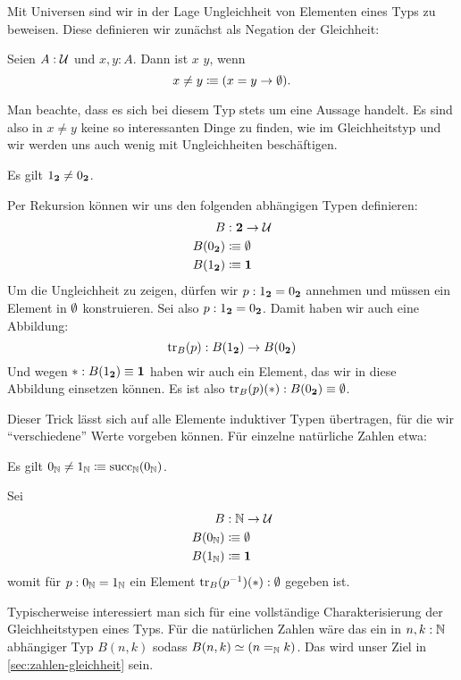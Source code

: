 Mit Universen sind wir in der Lage Ungleichheit von Elementen eines Typs zu beweisen.
Diese definieren wir zunächst als Negation der Gleichheit:
\begin{definition}
  Seien $A:\mathcal{U}$ und $x,y:A$. Dann ist $x$  $y$, wenn
  \[
    x\not= y\vcentcolon\mspace{-1.2mu}\equiv (x=y\to \emptyset).
  \]
\end{definition}
Man beachte, dass es sich bei diesem Typ stets um eine Aussage handelt.
Es sind also in $x\not= y$ keine so interessanten Dinge zu finden, wie im Gleichheitstyp und wir werden uns auch wenig mit Ungleichheiten beschäftigen.
\begin{bemerkung}
  Es gilt $1_{\mathbf{2}} \not= 0_{\mathbf{2}}$.
\end{bemerkung}
\begin{beweis}
  Per Rekursion können wir uns den folgenden abhängigen Typen definieren:
  \begin{align*}
    B&:\mathbf{2}\to\mathcal{U} \\
    B(0_{\mathbf{2}})&\vcentcolon\mspace{-1.2mu}\equiv \emptyset \\
    B(1_{\mathbf{2}})&\vcentcolon\mspace{-1.2mu}\equiv \mathbf{1}
  \end{align*}
  Um die Ungleichheit zu zeigen, dürfen wir $p:1_{\mathbf{2}} = 0_{\mathbf{2}}$ annehmen und müssen ein Element in $\emptyset$ konstruieren.
  Sei also $p:1_{\mathbf{2}} = 0_{\mathbf{2}}$. Damit haben wir auch eine Abbildung:
  \[
    \mathrm{tr}_B(p):B(1_{\mathbf{2}})\to B(0_{\mathbf{2}})
  \]
  Und wegen $\ast:B(1_{\mathbf{2}})\equiv \mathbf{1}$ haben wir auch ein Element, das wir in diese Abbildung einsetzen können.
  Es ist also $\mathrm{tr}_B(p)(\ast):B(0_{\mathbf{2}})\equiv \emptyset$.
\end{beweis}
Dieser Trick lässt sich auf alle Elemente induktiver Typen übertragen, für die wir ``verschiedene'' Werte vorgeben können.
Für einzelne natürliche Zahlen etwa:
\begin{bemerkung}
  Es gilt $0_{\mathbb{N}}\not= 1_{\mathbb{N}}\vcentcolon\mspace{-1.2mu}\equiv \mathrm{succ}_{\mathbb{N}}(0_{\mathbb{N}})$.
\end{bemerkung}
\begin{beweis}
  Sei
  \begin{align*}
    B&:\mathbb{N}\to \mathcal{U} \\
    B(0_{\mathbb{N}})&\vcentcolon\mspace{-1.2mu}\equiv \emptyset \\
    B(1_{\mathbb{N}})&\vcentcolon\mspace{-1.2mu}\equiv \mathbf{1}
  \end{align*}
  womit für $p:0_{\mathbb{N}}=1_{\mathbb{N}}$ ein Element $\mathrm{tr}_B(p^{-1})(\ast):\emptyset$ gegeben ist.
\end{beweis}
Typischerweise interessiert man sich für eine vollständige Charakterisierung der Gleichheitstypen eines Typs.
Für die natürlichen Zahlen wäre das ein in $n,k:\mathbb{N}$ abhängiger Typ $B(n,k)$ sodass $B(n,k)\simeq (n=_{\mathbb{N}} k)$.
Das wird unser Ziel in \cref{sec:zahlen-gleichheit} sein.

